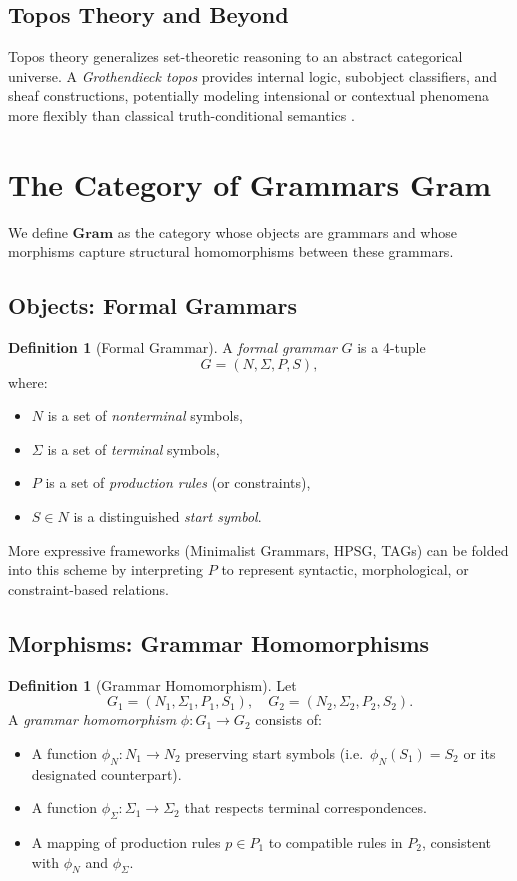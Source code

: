 \documentclass[12pt]{article}
\theoremstyle{plain}
\theoremstyle{definition}
\newtheorem{definition}[theorem]{Definition}
\begin{document}
\subsection{Topos Theory and Beyond}
Topos theory generalizes set-theoretic reasoning to an abstract categorical universe. A \emph{Grothendieck topos} provides internal logic, subobject classifiers, and sheaf constructions, potentially modeling intensional or contextual phenomena more flexibly than classical truth-conditional semantics \cite{Awodey}.

\section{The Category of Grammars \texorpdfstring{$\mathbf{Gram}$}{Gram}}
We define \(\mathbf{Gram}\) as the category whose objects are grammars and whose morphisms capture structural homomorphisms between these grammars.

\subsection{Objects: Formal Grammars}
\begin{definition}[Formal Grammar]
A \emph{formal grammar} \(G\) is a 4-tuple
\[
G = (N, \Sigma, P, S),
\]
where:
\begin{itemize}
    \item \(N\) is a set of \emph{nonterminal} symbols,
    \item \(\Sigma\) is a set of \emph{terminal} symbols,
    \item \(P\) is a set of \emph{production rules} (or constraints),
    \item \(S \in N\) is a distinguished \emph{start symbol}.
\end{itemize}
More expressive frameworks (Minimalist Grammars, HPSG, TAGs) can be folded into this scheme by interpreting \(P\) to represent syntactic, morphological, or constraint-based relations.
\end{definition}

\subsection{Morphisms: Grammar Homomorphisms}
\begin{definition}[Grammar Homomorphism]\label{def:grammar-homomorphism}
Let 
\[
G_1 = (N_1, \Sigma_1, P_1, S_1), \quad
G_2 = (N_2, \Sigma_2, P_2, S_2).
\]
A \emph{grammar homomorphism} \(\phi: G_1 \to G_2\) consists of:
\begin{itemize}
    \item A function \(\phi_N: N_1 \to N_2\) preserving start symbols (i.e.\ \(\phi_N(S_1) = S_2\) or its designated counterpart).
    \item A function \(\phi_\Sigma: \Sigma_1 \to \Sigma_2\) that respects terminal correspondences.
    \item A mapping of production rules \(p \in P_1\) to compatible rules in \(P_2\), consistent with \(\phi_N\) and \(\phi_\Sigma\).
\end{itemize}
\end{definition}
\end{document}
